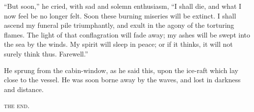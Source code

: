 ``But soon,'' he cried, with sad and
solemn enthusiasm, ``I shall die, and
what I now feel be no longer felt.
Soon these burning miseries will be
extinct. I shall ascend my funeral
pile triumphantly, and exult in the
agony of the torturing flames. The
light of that conflagration will fade
away; my ashes will be swept into the
sea by the winds. My spirit will sleep
in peace; or if it thinks, it will not
surely think thus. Farewell.''

He sprung from the cabin-window,
as he said this, upon the ice-raft which
lay close to the vessel. He was soon
borne away by the waves, and lost in
darkness and distance.

\bigskip
\begin{center}
\textsc{the end.}
\end{center}
